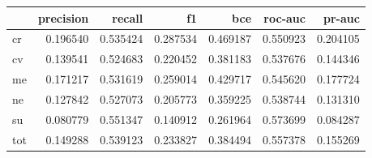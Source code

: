 \begin{tabular}{lrrrrrr}
\toprule
{} &  precision &    recall &        f1 &       bce &   roc-auc &    pr-auc \\
\midrule
cr  &   0.196540 &  0.535424 &  0.287534 &  0.469187 &  0.550923 &  0.204105 \\
cv  &   0.139541 &  0.524683 &  0.220452 &  0.381183 &  0.537676 &  0.144346 \\
me  &   0.171217 &  0.531619 &  0.259014 &  0.429717 &  0.545620 &  0.177724 \\
ne  &   0.127842 &  0.527073 &  0.205773 &  0.359225 &  0.538744 &  0.131310 \\
su  &   0.080779 &  0.551347 &  0.140912 &  0.261964 &  0.573699 &  0.084287 \\
tot &   0.149288 &  0.539123 &  0.233827 &  0.384494 &  0.557378 &  0.155269 \\
\bottomrule
\end{tabular}
